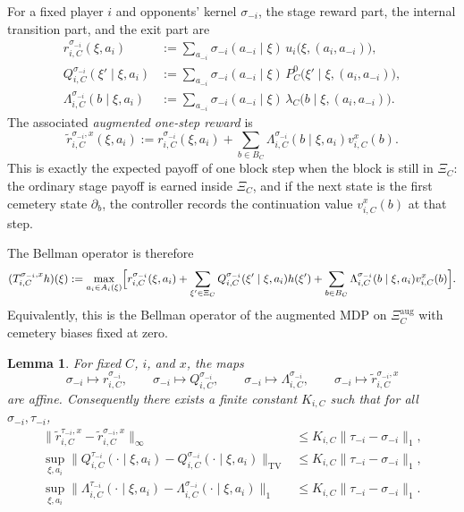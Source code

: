 \documentclass[12pt]{article}
\newtheorem{lemma}[theorem]{Lemma}
\theoremstyle{definition}
\newcommand{\1}{\mathbf{1}}
\begin{document}
For a fixed player $i$ and opponents' kernel $\sigma_{-i}$, the stage reward part,
the internal transition part, and the exit part are
\begin{align}
\label{eq:r-sigma}
r_{i,C}^{\sigma_{-i}}(\xi,a_i)
&:=
\sum_{a_{-i}}\sigma_{-i}(a_{-i}\mid\xi)
\,u_i\bigl(\xi,(a_i,a_{-i})\bigr),
\\
\label{eq:Q-sigma}
Q_{i,C}^{\sigma_{-i}}(\xi'\mid \xi,a_i)
&:=
\sum_{a_{-i}}\sigma_{-i}(a_{-i}\mid\xi)
\,P_C^0\bigl(\xi'\mid\xi,(a_i,a_{-i})\bigr),
\\
\label{eq:q-exit-sigma}
\Lambda_{i,C}^{\sigma_{-i}}(b\mid\xi,a_i)
&:=
\sum_{a_{-i}}\sigma_{-i}(a_{-i}\mid\xi)
\,\lambda_C\bigl(b\mid\xi,(a_i,a_{-i})\bigr).
\end{align}
The associated \emph{augmented one-step reward} is
\begin{equation}
\label{eq:augmented-reward}
\widetilde r_{i,C}^{\sigma_{-i},x}(\xi,a_i)
:=
r_{i,C}^{\sigma_{-i}}(\xi,a_i)
+
\sum_{b\in B_C}\Lambda_{i,C}^{\sigma_{-i}}(b\mid\xi,a_i)v_{i,C}^x(b).
\end{equation}
This is exactly the expected payoff of one block step when the block is still in
$\Xi_C$: the ordinary stage payoff is earned inside $\Xi_C$, and if the next state
is the first cemetery state $\partial_b$, the controller records the continuation
value $v_{i,C}^x(b)$ at that step.

The Bellman operator is therefore
\begin{equation}
\label{eq:Bellman-operator}
(T_{i,C}^{\sigma_{-i},x}h)(\xi)
:=
\max_{a_i\in A_i(\xi)}\Bigl[
 r_{i,C}^{\sigma_{-i}}(\xi,a_i)
 +\sum_{\xi'\in\Xi_C}Q_{i,C}^{\sigma_{-i}}(\xi'\mid\xi,a_i)h(\xi')
 +\sum_{b\in B_C}\Lambda_{i,C}^{\sigma_{-i}}(b\mid\xi,a_i)v_{i,C}^x(b)
 \Bigr].
\end{equation}
Equivalently, this is the Bellman operator of the augmented MDP on
$\Xi_C^{\mathrm{aug}}$ with cemetery biases fixed at zero.

\begin{lemma}
\label{lem:coeff-affine}
For fixed $C$, $i$, and $x$, the maps
\[
\sigma_{-i}\mapsto r_{i,C}^{\sigma_{-i}},
\qquad
\sigma_{-i}\mapsto Q_{i,C}^{\sigma_{-i}},
\qquad
\sigma_{-i}\mapsto \Lambda_{i,C}^{\sigma_{-i}},
\qquad
\sigma_{-i}\mapsto \widetilde r_{i,C}^{\sigma_{-i},x}
\]
are affine. Consequently there exists a finite constant $K_{i,C}$ such that for
all $\sigma_{-i},\tau_{-i}$,
\begin{align}
\|\widetilde r_{i,C}^{\tau_{-i},x}-\widetilde r_{i,C}^{\sigma_{-i},x}\|_\infty
&\le K_{i,C}\|\tau_{-i}-\sigma_{-i}\|_1,
\label{eq:r-lip}
\\
\sup_{\xi,a_i}\|Q_{i,C}^{\tau_{-i}}(\cdot\mid\xi,a_i)-Q_{i,C}^{\sigma_{-i}}(\cdot\mid\xi,a_i)\|_{\mathrm{TV}}
&\le K_{i,C}\|\tau_{-i}-\sigma_{-i}\|_1,
\label{eq:Q-lip}
\\
\sup_{\xi,a_i}\|\Lambda_{i,C}^{\tau_{-i}}(\cdot\mid\xi,a_i)-\Lambda_{i,C}^{\sigma_{-i}}(\cdot\mid\xi,a_i)\|_{1}
&\le K_{i,C}\|\tau_{-i}-\sigma_{-i}\|_1.
\label{eq:Lambda-lip}
\end{align}
\end{lemma}
\end{document}
